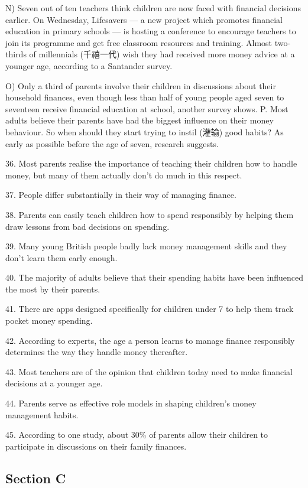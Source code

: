 \documentclass[UTF8,11pt]{ctexart}
\begin{document}
N) Seven out of ten teachers think children are now faced with financial decisions earlier. On Wednesday, Lifesavers — a new project which promotes financial education in primary schools — is hosting a conference to encourage teachers to join its programme and get free classroom resources and training. Almost two-thirds of millennials (千禧一代) wish they had received more money advice at a younger age, according to a Santander survey.


O) Only a third of parents involve their children in discussions about their household finances, even though less than half of young people aged seven to seventeen receive financial education at school, another survey shows. P. Most adults believe their parents have had the biggest influence on their money behaviour. So when should they start trying to instil (灌输) good habits? As early as possible before the age of seven, research suggests.


36. Most parents realise the importance of teaching their children how to handle money, but many of them actually don’t do much in this respect.


37. People differ substantially in their way of managing finance.


38. Parents can easily teach children how to spend responsibly by helping them draw lessons from bad decisions on spending.


39. Many young British people badly lack money management skills and they don’t learn them early enough.


40. The majority of adults believe that their spending habits have been influenced the most by their parents.


41. There are apps designed specifically for children under 7 to help them track pocket money spending.


42. According to experts, the age a person learns to manage finance responsibly determines the way they handle money thereafter.


43. Most teachers are of the opinion that children today need to make financial decisions at a younger age.


44. Parents serve as effective role models in shaping children’s money management habits.


45. According to one study, about 30\% of parents allow their children to participate in discussions on their family finances.


\subsection*{\textbf{Section C}}
\end{document}
